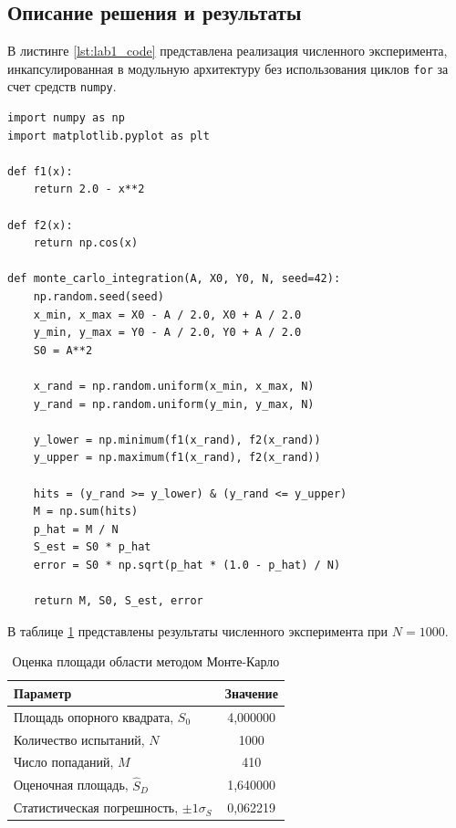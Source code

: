 \documentclass[a4paper,14pt]{extarticle}
\begin{document}
\subsection{Описание решения и результаты}
В листинге \ref{lst:lab1_code} представлена реализация численного эксперимента, инкапсулированная в модульную архитектуру без использования циклов \texttt{for} за счет средств \texttt{numpy}.

\begin{lstlisting}[caption={Реализация метода Монте-Карло для оценки площади}, label={lst:lab1_code}]
import numpy as np
import matplotlib.pyplot as plt

def f1(x):
    return 2.0 - x**2

def f2(x):
    return np.cos(x)

def monte_carlo_integration(A, X0, Y0, N, seed=42):
    np.random.seed(seed)
    x_min, x_max = X0 - A / 2.0, X0 + A / 2.0
    y_min, y_max = Y0 - A / 2.0, Y0 + A / 2.0
    S0 = A**2

    x_rand = np.random.uniform(x_min, x_max, N)
    y_rand = np.random.uniform(y_min, y_max, N)

    y_lower = np.minimum(f1(x_rand), f2(x_rand))
    y_upper = np.maximum(f1(x_rand), f2(x_rand))

    hits = (y_rand >= y_lower) & (y_rand <= y_upper)
    M = np.sum(hits)
    p_hat = M / N
    S_est = S0 * p_hat
    error = S0 * np.sqrt(p_hat * (1.0 - p_hat) / N)

    return M, S0, S_est, error
\end{lstlisting}

В таблице \ref{tab:lab1_res} представлены результаты численного эксперимента при $N = 1000$.

\begin{table}[H]
    \centering
    \caption{Оценка площади области методом Монте-Карло}
    \label{tab:lab1_res}
    \begin{tabular}{lc}
        \toprule
        \textbf{Параметр} & \textbf{Значение} \\
        \midrule
        Площадь опорного квадрата, $S_0$ & 4,000000 \\
        Количество испытаний, $N$ & 1000 \\
        Число попаданий, $M$ & 410 \\
        Оценочная площадь, $\hat{S}_D$ & 1,640000 \\
        Статистическая погрешность, $\pm 1\sigma_S$ & 0,062219 \\
        \bottomrule
    \end{tabular}
\end{table}
\end{document}
